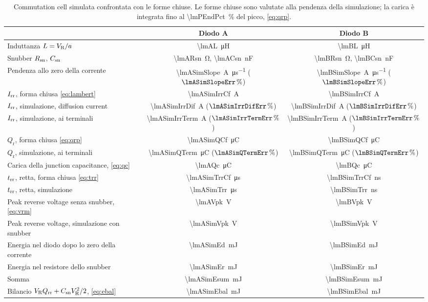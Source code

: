 \documentclass[10pt,a4paper]{scrartcl}
\let\newcommand\lmitdefine
\newcommand{\VR}{V_\mathrm{R}}
\newcommand{\Irr}{I_\mathrm{rr}}
\newcommand{\Qrr}{Q_\mathrm{rr}}
\newcommand{\trr}{t_\mathrm{rr}}
\newcommand{\Csn}{C_\mathrm{sn}}
\newcommand{\Rsn}{R_\mathrm{sn}}
\begin{document}
\begin{table}[htb]
\centering\small
\caption{Commutation cell simulata confrontata con le forme chiuse. Le forme chiuse sono valutate alla pendenza della simulazione; la carica è integrata fino al \SI{\lmPEndPct}{\percent} del picco, \eqref{eq:qrp}.}
\label{tab:cell}
\begin{tabular}{@{}lcc@{}}
\toprule
 & Diodo A & Diodo B \\
\midrule
Induttanza $L = \VR/a$ & \SI{\lmAL}{\micro\henry} & \SI{\lmBL}{\micro\henry} \\
Snubber $\Rsn$, $\Csn$ & \SI{\lmARsn}{\ohm}, \SI{\lmACsn}{\nano\farad} & \SI{\lmBRsn}{\ohm}, \SI{\lmBCsn}{\nano\farad} \\
Pendenza allo zero della corrente & \SI{\lmASimSlope}{\ampere\per\micro\second} ($\lmASimSlopeErr\,\%$) & \SI{\lmBSimSlope}{\ampere\per\micro\second} ($\lmBSimSlopeErr\,\%$) \\
\addlinespace
$\Irr$, forma chiusa \eqref{eq:lambert} & \SI{\lmASimIrrCf}{\ampere} & \SI{\lmBSimIrrCf}{\ampere} \\
$\Irr$, simulazione, diffusion current & \SI{\lmASimIrrDif}{\ampere} ($\lmASimIrrDifErr\,\%$) & \SI{\lmBSimIrrDif}{\ampere} ($\lmBSimIrrDifErr\,\%$) \\
$\Irr$, simulazione, ai terminali & \SI{\lmASimIrrTerm}{\ampere} ($\lmASimIrrTermErr\,\%$) & \SI{\lmBSimIrrTerm}{\ampere} ($\lmBSimIrrTermErr\,\%$) \\
\addlinespace
$Q_\mathrm{r}$, forma chiusa \eqref{eq:qrp} & \SI{\lmASimQCf}{\micro\coulomb} & \SI{\lmBSimQCf}{\micro\coulomb} \\
$Q_\mathrm{r}$, simulazione, ai terminali & \SI{\lmASimQTerm}{\micro\coulomb} ($\lmASimQTermErr\,\%$) & \SI{\lmBSimQTerm}{\micro\coulomb} ($\lmBSimQTermErr\,\%$) \\
Carica della junction capacitance, \eqref{eq:qc} & \SI{\lmAQc}{\micro\coulomb} & \SI{\lmBQc}{\micro\coulomb} \\
\addlinespace
$\trr$, retta, forma chiusa \eqref{eq:trr} & \SI{\lmASimTrrCf}{\micro\second} & \SI{\lmBSimTrrCf}{\nano\second} \\
$\trr$, retta, simulazione & \SI{\lmASimTrr}{\micro\second} & \SI{\lmBSimTrr}{\nano\second} \\
\addlinespace
Peak reverse voltage senza snubber, \eqref{eq:vrm} & \SI{\lmAVpk}{\volt} & \SI{\lmBVpk}{\volt} \\
Peak reverse voltage, simulazione con snubber & \SI{\lmASimVpk}{\volt} & \SI{\lmBSimVpk}{\volt} \\
Energia nel diodo dopo lo zero della corrente & \SI{\lmASimEd}{\milli\joule} & \SI{\lmBSimEd}{\milli\joule} \\
Energia nel resistore dello snubber & \SI{\lmASimEr}{\milli\joule} & \SI{\lmBSimEr}{\milli\joule} \\
Somma & \SI{\lmASimEsum}{\milli\joule} & \SI{\lmBSimEsum}{\milli\joule} \\
Bilancio $\VR\Qrr + \Csn\VR^2/2$, \eqref{eq:ebal} & \SI{\lmASimEbal}{\milli\joule} & \SI{\lmBSimEbal}{\milli\joule} \\
\bottomrule
\end{tabular}
\end{table}
\end{document}
